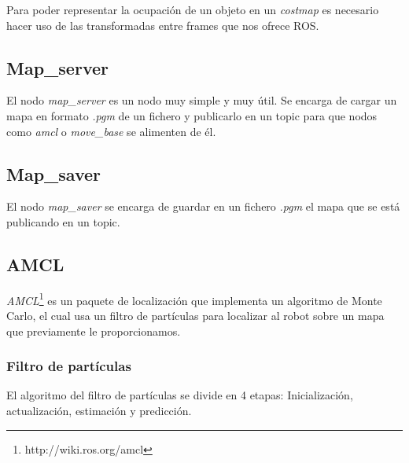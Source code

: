 Para poder representar la ocupación de un objeto en un \textit{costmap} es necesario hacer uso de las transformadas entre frames que nos ofrece ROS.

\subsection{Map\_server}
\label{sec:mapserver}
El nodo \textit{map\_server} es un nodo muy simple y muy útil. Se encarga de cargar un mapa en formato \textit{.pgm} de un fichero y publicarlo en un topic para que nodos como \textit{amcl} o \textit{move\_base} se alimenten de él.

\subsection{Map\_saver}
\label{sec:mapserver}
El nodo \textit{map\_saver} se encarga de guardar en un fichero \textit{.pgm} el mapa que se está publicando en un topic.

\subsection{AMCL}
\label{sec:amcl}
\textit{AMCL}\footnote{http://wiki.ros.org/amcl} es un paquete de localización que implementa un algoritmo de Monte Carlo, el cual usa un filtro de partículas para localizar al robot sobre un mapa que previamente le proporcionamos.
\subsubsection{Filtro de partículas}

El algoritmo del filtro de partículas se divide en 4 etapas: Inicialización, actualización, estimación y predicción. 

